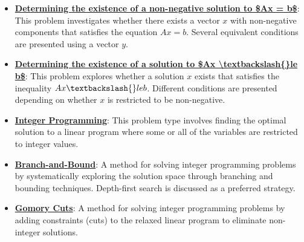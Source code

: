 \documentclass{article}%
\begin{document}
\begin{itemize}[leftmargin=*]%
\item \href{https://www.math.purdue.edu/~yipn/421/2024-10-28-Farkas.pdf#page=2}{\textbf{Determining the existence of a non{-}negative solution to \$Ax = b\$}}: This problem investigates whether there exists a vector $x$ with non-negative components that satisfies the equation $Ax = b$. Several equivalent conditions are presented using a vector $y$.%
\item \href{https://www.math.purdue.edu/~yipn/421/2024-10-28-Farkas.pdf#page=4}{\textbf{Determining the existence of a solution to \$Ax \textbackslash{}textbackslash\{\}le b\$}}: This problem explores whether a solution $x$ exists that satisfies the inequality $Ax \textbackslash{}le b$. Different conditions are presented depending on whether $x$ is restricted to be non-negative.%
\end{itemize}%
\begin{itemize}[leftmargin=*]%
\item \href{https://www.math.purdue.edu/~yipn/421/2024-10-31-IntLinProg.pdf#page=1}{\textbf{Integer Programming}}: This problem type involves finding the optimal solution to a linear program where some or all of the variables are restricted to integer values.%
\item \href{https://www.math.purdue.edu/~yipn/421/2024-10-31-IntLinProg.pdf#page=5}{\textbf{Branch{-}and{-}Bound}}: A method for solving integer programming problems by systematically exploring the solution space through branching and bounding techniques. Depth-first search is discussed as a preferred strategy.%
\item \href{https://www.math.purdue.edu/~yipn/421/2024-10-31-IntLinProg.pdf#page=15}{\textbf{Gomory Cuts}}: A method for solving integer programming problems by adding constraints (cuts) to the relaxed linear program to eliminate non-integer solutions.%
\end{itemize}%
\end{document}
